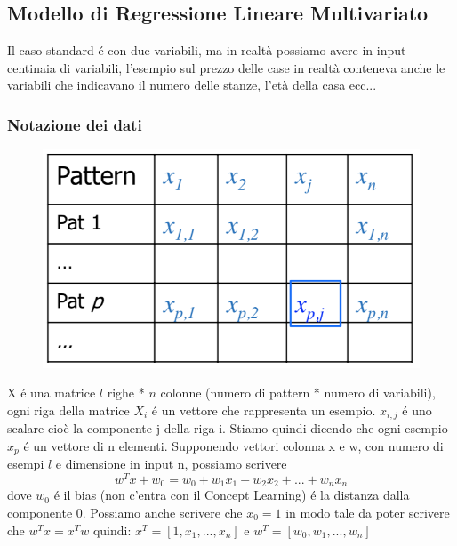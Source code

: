 \documentclass{article}
\begin{document}
\subsection{Modello di Regressione Lineare Multivariato}
Il caso standard é con due variabili, ma in realtà possiamo avere in input centinaia di variabili, l'esempio sul prezzo delle case in realtà conteneva anche le variabili che indicavano il numero delle stanze, l'età della casa ecc... 
\subsubsection{Notazione dei dati}
\begin{figure}[H]
    \centering
    \includegraphics[scale=0.6]{Images/datanotation.png}
\end{figure}
X é una matrice $l$ righe * $n$ colonne (numero di pattern * numero di variabili), ogni riga della matrice $X_i$ é un vettore che rappresenta un esempio. $x_{i,j}$ é uno scalare cioè la componente j della riga i. \newline
Stiamo quindi dicendo che ogni esempio $x_p$ é un vettore di n elementi. \newline
Supponendo vettori colonna x e w, con numero di esempi $l$ e dimensione in input n, possiamo scrivere 
\begin{equation}
    w^Tx+w_0 = w_0+w_1x_1+w_2x_2+...+w_nx_n
\end{equation} 
dove $w_0$ é il bias (non c'entra con il Concept Learning) é la distanza dalla componente 0. Possiamo anche scrivere che $x_0=1$ in modo tale da poter scrivere che $w^Tx = x^Tw$ quindi: $x^T = [1,x_1,...,x_n]$ e $w^T = [w_0, w_1, ..., w_n]$
\clearpage
\end{document}
